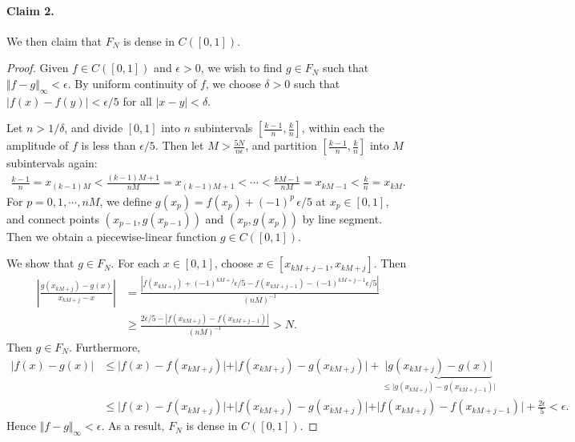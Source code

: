\documentclass{article}
\begin{document}
\paragraph{Claim 2.} We then claim that $F_N$ is dense in $C([0,1])$. 

\begin{proof}
Given $f\in C([0,1])$ and $\epsilon>0$, we wish to find $g\in F_N$ such that $\Vert f-g\Vert_\infty < \epsilon$. By uniform continuity of $f$, we choose $\delta>0$ such that $\vert f(x)-f(y)\vert < \epsilon/5$ for all $\vert x-y\vert <\delta$. 

Let $n>1/\delta$, and divide $[0,1]$ into $n$ subintervals $\left[\frac{k-1}{n},\frac{k}{n}\right]$, within each the amplitude of $f$ is less than $\epsilon/5$. Then let $M>\frac{5N}{n\epsilon}$, and partition $\left[\frac{k-1}{n},\frac{k}{n}\right]$ into $M$ subintervals again:
\begin{align*}
	\frac{k-1}{n} = x_{(k-1)M} < \frac{(k-1)M+1}{nM} =  x_{(k-1)M+1} < \cdots < \frac{kM - 1}{nM} =  x_{kM-1} < \frac{k}{n} = x_{kM}.
\end{align*}
For $p=0,1,\cdots,nM$, we define $g(x_p) = f(x_p) + (-1)^p\,\epsilon/5$ at $x_p\in[0,1]$, and connect points $(x_{p-1},g(x_{p-1}))$ and $(x_p,g(x_p))$ by line segment. Then we obtain a piecewise-linear function $g\in C([0,1])$.

We show that $g\in F_N$. For each $x\in [0,1]$, choose $x\in[x_{kM+j - 1},x_{kM+j}]$. Then
\begin{align*}
	\left\vert\frac{g(x_{kM+j}) - g(x)}{x_{kM+j} - x}\right\vert &= \frac{\left\vert f(x_{kM+j}) + (-1)^{kM+j}\epsilon/5 - f(x_{kM+j-1}) - (-1)^{kM+j-1}\epsilon/5\right\vert}{(nM)^{-1}}\\
	&\geq \frac{2\epsilon/5 - \left\vert f(x_{kM+j}) - f(x_{kM+j-1})\right\vert}{(nM)^{-1}} > N.
\end{align*}
Then $g\in F_N$. Furthermore, 
\begin{align*}
	\vert f(x)-g(x)\vert &\leq \vert f(x)-f(x_{kM+j})\vert + \vert f(x_{kM+j})-g(x_{kM+j})\vert + \underbrace{\vert g(x_{kM+j})-g(x)\vert}_{\leq \vert g(x_{kM+j})-g(x_{kM+j-1})\vert}\\
	&\leq \vert f(x)-f(x_{kM+j})\vert + \vert f(x_{kM+j})-g(x_{kM+j})\vert + \vert f(x_{kM+j})-f(x_{kM+j-1})\vert + \frac{2\epsilon}{5} < \epsilon.
\end{align*}
Hence $\Vert f-g\Vert_\infty <\epsilon$. As a result, $F_N$ is dense in $C([0,1])$.
\end{proof}
\end{document}
